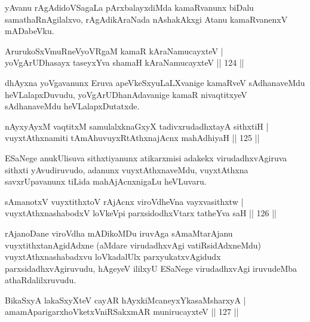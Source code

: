 \begin{artha}
yAvanu rAgAdidoVSagaLa pArxbalayxdiMda kamaRvanunx biDalu samathaRnAgilalxvo, rAgAdikAraNada nAshakAkxgi Atanu kamaRvanenxV mADabeVku.
\end{artha}


\begin{shl}
ArurukoSxVmuRneVyoVRgaM kamaR kAraNamucayxteV |\\
yoVgArUDhasayx taseyxYva shamaH kAraNamucayxteV \hfill || 124 ||
\end{shl}

\begin{artha}%
dhAyxna yoVgavanunx Eruva apeVkeSxyuLaLXvanige kamaRveV sAdhanaveMdu heVLalapxDuvudu, yoVgArUDhanAdavanige kamaR nivaqtitxyeV sAdhanaveMdu heVLalapxDutatxde.
\end{artha}

\begin{shl}
nAyxyAyxM vaqtitxM samulalxknaGxyX tadivxrudadhxtayA sithxtiH |\\
vuyxtAthxnamiti tAmAhuvuyxRtAthxnajAcnx mahAdhiyaH \hfill || 125 ||
\end{shl}

\begin{artha}
ESaNege anukUlisuva sithxtiyanunx atikarxmisi adakekx virudadhxvAgiruva sithxti yAvudiruvudo, adanunx vuyxtAthxnaveMdu, vuyxtAthxna savxrUpavanunx tiLida mahAjAcnxnigaLu heVLuvaru.
\end{artha}


\begin{shl}
sAmanotxV  vuyxtithxtoV rAjAcnx viroVdheVna vayxvasithxtw |\\
vuyxtAthxnashabodxV loVkeV\s pi parxsidodhxV\s tarx tatheYva saH \hfill || 126 ||
\end{shl}

\begin{artha}
rAjanoDane viroVdha mADikoMDu iruvAga sAmaMta\-\break rAjanu vuyxtithxtanAgidAdxne (aMdare virudadhxvAgi vatiRsidAdxneMdu) vuyxtAthxnashabadxvu loVkadalUlx parxyukatxvAgidudx parxsidadhxvAgiruvudu, hAgeyeV ililxyU ESaNege virudadhxvAgi iruvudeMba athaRdalilxruvudu.
\end{artha}


\begin{shl}
BikaSxyA lakaSxyXteV cayAR hAyxkiMcaneyxYkasaMsharxyA |\\
amamA\s parigarxhoVketxVniRSakxmAR munirucayxteV \hfill || 127 ||
\end{shl}

